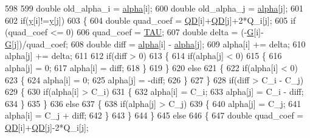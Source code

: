 \begin{DoxyCode}
598 
599         \textcolor{keywordtype}{double} old\_alpha\_i = \hyperlink{class_solver_a00d7a7cefa2504d41c7db6cd7cc6b428}{alpha}[i];
600         \textcolor{keywordtype}{double} old\_alpha\_j = \hyperlink{class_solver_a00d7a7cefa2504d41c7db6cd7cc6b428}{alpha}[j];
601 
602         \textcolor{keywordflow}{if}(\hyperlink{class_solver_a3acc1043d06dedf87f054ff3eea5c426}{y}[i]!=\hyperlink{class_solver_a3acc1043d06dedf87f054ff3eea5c426}{y}[j])
603         \{
604             \textcolor{keywordtype}{double} quad\_coef = \hyperlink{class_solver_a7c7b7b1207983543855165e8eb249f2a}{QD}[i]+\hyperlink{class_solver_a7c7b7b1207983543855165e8eb249f2a}{QD}[j]+2*Q\_i[j];
605             \textcolor{keywordflow}{if} (quad\_coef <= 0)
606                 quad\_coef = \hyperlink{svm_8cpp_a3d8c9c145887af5174ba4cc6789862ad}{TAU};
607             \textcolor{keywordtype}{double} delta = (-\hyperlink{class_solver_ad8ab27068f2e045591970aae1201afe9}{G}[i]-\hyperlink{class_solver_ad8ab27068f2e045591970aae1201afe9}{G}[j])/quad\_coef;
608             \textcolor{keywordtype}{double} diff = \hyperlink{class_solver_a00d7a7cefa2504d41c7db6cd7cc6b428}{alpha}[i] - \hyperlink{class_solver_a00d7a7cefa2504d41c7db6cd7cc6b428}{alpha}[j];
609             alpha[i] += delta;
610             alpha[j] += delta;
611             
612             \textcolor{keywordflow}{if}(diff > 0)
613             \{
614                 \textcolor{keywordflow}{if}(alpha[j] < 0)
615                 \{
616                     alpha[j] = 0;
617                     alpha[i] = diff;
618                 \}
619             \}
620             \textcolor{keywordflow}{else}
621             \{
622                 \textcolor{keywordflow}{if}(alpha[i] < 0)
623                 \{
624                     alpha[i] = 0;
625                     alpha[j] = -diff;
626                 \}
627             \}
628             \textcolor{keywordflow}{if}(diff > C\_i - C\_j)
629             \{
630                 \textcolor{keywordflow}{if}(alpha[i] > C\_i)
631                 \{
632                     alpha[i] = C\_i;
633                     alpha[j] = C\_i - diff;
634                 \}
635             \}
636             \textcolor{keywordflow}{else}
637             \{
638                 \textcolor{keywordflow}{if}(alpha[j] > C\_j)
639                 \{
640                     alpha[j] = C\_j;
641                     alpha[i] = C\_j + diff;
642                 \}
643             \}
644         \}
645         \textcolor{keywordflow}{else}
646         \{
647             \textcolor{keywordtype}{double} quad\_coef = \hyperlink{class_solver_a7c7b7b1207983543855165e8eb249f2a}{QD}[i]+\hyperlink{class_solver_a7c7b7b1207983543855165e8eb249f2a}{QD}[j]-2*Q\_i[j];

\end{DoxyCode}
